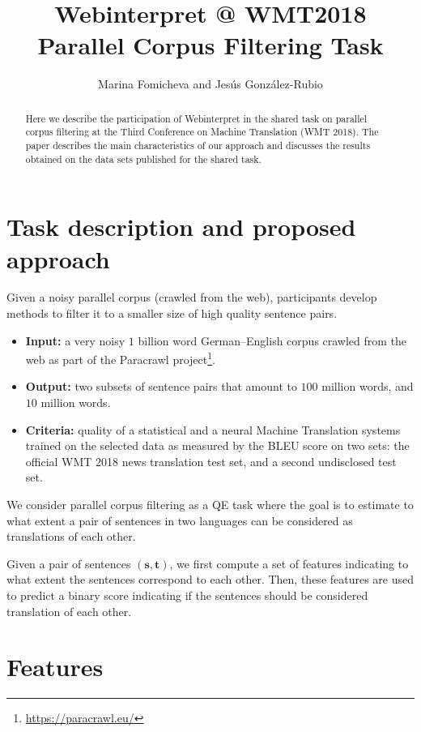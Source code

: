 \documentclass[a0]{sciposter}
\title{Webinterpret @ WMT2018\\Parallel Corpus Filtering Task}
\author{Marina Fomicheva and Jes\'{u}s Gonz\'{a}lez-Rubio}
\institute{AT Language Solutions, Webinterpret}
\begin{document}
\maketitle

\begin{multicols*}{2}


\begin{abstract}
Here we describe the participation of Webinterpret in the shared task on parallel corpus filtering at the Third Conference on Machine Translation (WMT 2018). The paper describes the main characteristics of our approach and discusses the results obtained on the data sets published for the shared task.
\end{abstract}

\section{Task description and proposed approach}
Given a noisy parallel corpus (crawled from the web), participants develop methods to filter it to a smaller size of high quality sentence pairs.

\begin{itemize}
  \item {\bf Input:} a very noisy $1$ billion word German--English corpus crawled from the web as part of the Paracrawl project\footnote{\url{https://paracrawl.eu/}}.
  \item {\bf Output:} two subsets of sentence pairs that amount to $100$ million words, and $10$ million words.
  \item {\bf Criteria:} quality of a statistical and a neural Machine Translation systems trained on the selected data as measured by the BLEU score on two sets: the official WMT 2018 news translation test set, and a second undisclosed test set.
\end{itemize}

We consider parallel corpus filtering as a QE task where the goal is to estimate to what extent a pair of sentences in two languages can be considered as translations of each other. 

Given a pair of sentences $(\mathbf{s}, \mathbf{t})$, we first compute a set of features indicating to what extent the sentences correspond to each other. Then, these features are used to predict a binary score indicating if the sentences should be considered translation of each other.


\section{Features}

\end{multicols*}
\end{document}
